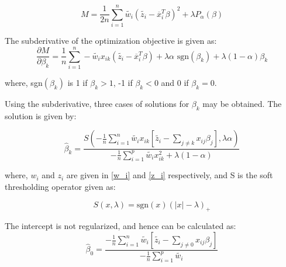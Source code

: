 \documentclass[12pt,a4paper]{report}
\begin{document}
\begin{equation} \label{z_i}
  M = \frac{1}{2n}\sum_{i=1}^n \widetilde{w_i} (\widetilde{z_i} - \overline x_i^T \beta)^2 
    + \lambda P_{\alpha}(\beta)
\end{equation}

The subderivative of the optimization objective is given as:
\begin{equation}
\frac{ \partial M}{\partial \beta_k} = \frac{1}{n}\sum_{i=1}^n - \widetilde{w_i} x_{ik} (\widetilde{ z_i} - \overline x_i^T \beta ) + \lambda \alpha \mbox{ sgn}(\beta_k) + \lambda (1-\alpha)\beta_k
\end{equation}

where, sgn$(\beta_k)$ is 1 if $\beta_k > 1$, -1 if $\beta_k<0$ and 0 if $\beta_k = 0$.

Using the subderivative, three cases of solutions for $\beta_k$ may be obtained. The solution is given by:

\begin{equation} \label{beta}
\hat \beta_k = \frac{S\left(-\frac{1}{n} \sum_{i=1}^n \widetilde{w_i} x_{ik} \left[\widetilde{ z_i} - \sum_{j \ne k} x_{ij} \beta_j \right], \lambda \alpha \right)}
					{-\frac{1}{n} \sum_{i=1}^p \widetilde{w_i} x_{ik}^2 + \lambda (1- \alpha)}
\end{equation}

where, $w_i$ and $z_i$ are given in \ref{w_i} and \ref{z_i} respectively, and S is the soft thresholding operator given as:

\begin{equation} \label{soft_thresh}
S(x, \lambda) = \mbox{sgn}(x)(|x| - \lambda)_+
\end{equation}

The intercept is not regularized, and hence can be calculated as:
\begin{equation} \label{intercept}
\hat \beta_0 = \frac{-\frac{1}{n} \sum_{i=1}^n \widetilde{w_i} \left[\widetilde{ z_i} - \sum_{j \ne 0} x_{ij} \beta_j \right]}
					{-\frac{1}{n} \sum_{i=1}^p \widetilde{w_i}}
\end{equation}
\end{document}
